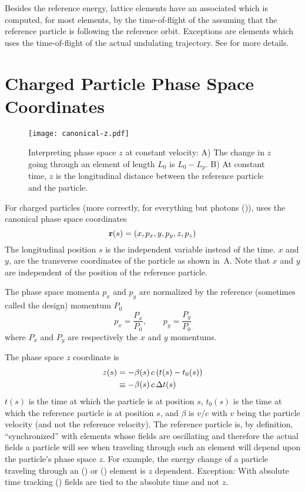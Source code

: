 Besides the reference energy, lattice elements have an associated  which is
computed, for most elements, by the time-of-flight of the  assuming that the
reference particle is following the reference orbit. Exceptions are  elements which uses
the time-of-flight of the actual undulating trajectory. See  for more details.

\section{Charged Particle Phase Space Coordinates}
\label{s:phase.space}

\begin{figure}
\centering \texttt{[image: canonical-z.pdf]} \caption[Interpreting phase space $z$ at constant
velocity.]  {Interpreting phase space $z$ at constant velocity: A) The change in $z$ going through
an element of length $L_0$ is $L_0 - L_p$.  B) At constant time, $z$ is the longitudinal distance
between the reference particle and the particle.}  \label{f:canonical.z}
\end{figure}

For charged particles (more correctly, for everything but photons ()),
\bmad uses the canonical phase space coordinates
\begin{equation}
  {\bf r}(s) = (x, p_x, y, p_y, z, p_z)
\end{equation}
The longitudinal position $s$ is the independent variable instead of the time. $x$ and $y$, are the
transverse coordinates of the particle as shown in~A. Note that $x$ and $y$ are
independent of the position of the reference particle.

The phase space momenta $p_x$ and $p_y$ are normalized by the reference (sometimes called the
design) momentum $P_0$
\begin{equation}
  p_x = \frac{P_x}{P_0}, \qquad
  p_y = \frac{P_y}{P_0}
  \label{ppp}
\end{equation}
where $P_x$ and $P_y$ are respectively the $x$ and $y$ momentums.

The phase space $z$ coordinate is 
\begin{align}
  z(s) &= -\beta(s) \, c \, (t(s) - t_0(s)) \nonumber \\
    &\equiv - \beta(s) \, c \, \Delta t(s)
  \label{zbctt}
\end{align}
$t(s)$ is the time at which the particle is at position $s$, $t_0(s)$ is the time at which the
reference particle is at position $s$, and $\beta$ is $v/c$ with $v$ being the particle velocity
(and not the reference velocity). The reference particle is, by definition, ``synchronized'' with
elements whose fields are oscillating and therefore the actual fields a particle will see when
traveling through such an element will depend upon the particle's phase space $z$. For example, the
energy change of a particle traveling through an  () or 
() element is $z$ dependent. Exception: With absolute time tracking ()
fields are tied to the absolute time and not $z$.

